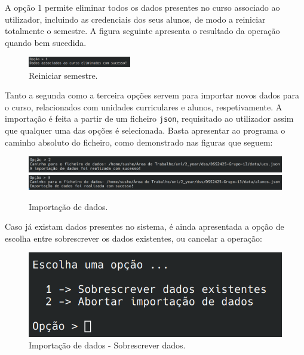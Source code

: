 \documentclass[12pt, a4paper]{article}
\begin{document}
A opção 1 permite eliminar todos os dados presentes no curso associado ao utilizador, incluindo as
credenciais dos seus alunos, de modo a reiniciar totalmente o semestre. A figura seguinte apresenta
o resultado da operação quando bem sucedida. \\

\begin{figure}[H]
    \centering
    \includegraphics[width=0.4\textwidth]{Imagens/Manual/DiretorCurso-1.png}
    \caption{Reiniciar semestre.}
\end{figure}

Tanto a segunda como a terceira opções servem para importar novos dados para o curso, relacionados
com unidades curriculares e alunos, respetivamente. A importação é feita a partir de um ficheiro
\texttt{json}, requisitado ao utilizador assim que qualquer uma das opções é selecionada. Basta
apresentar ao programa o caminho absoluto do ficheiro, como demonstrado nas figuras que seguem: \\

\begin{figure}[H]
    \centering
    \includegraphics[width=\textwidth]{Imagens/Manual/DiretorCurso-2.png}
    \includegraphics[width=\textwidth]{Imagens/Manual/DiretorCurso-3.png}
    \caption{Importação de dados.}
\end{figure}

Caso já existam dados presentes no sistema, é ainda apresentada a opção de escolha entre
sobrescrever os dados existentes, ou cancelar a operação: \\

\begin{figure}[H]
    \centering
    \includegraphics[width=\textwidth]{Imagens/Manual/DiretorCurso-SobrescreverDados.png}
    \caption{Importação de dados - Sobrescrever dados.}
\end{figure}
\end{document}
